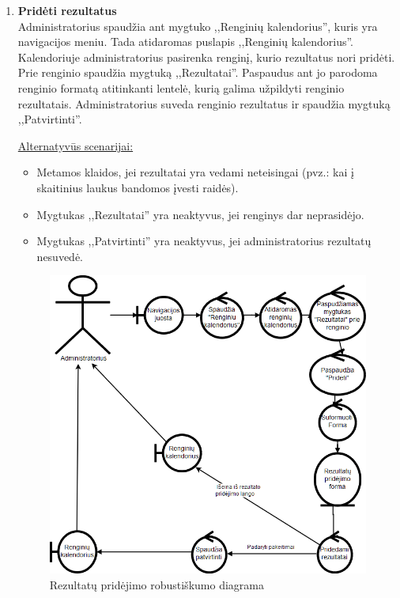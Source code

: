 \documentclass{VUMIFPSkursinis}
\begin{document}
\begin{enumerate} [label = \textbf{U\arabic*.}]
			\item \textbf{Pridėti rezultatus}   \\
					Administratorius spaudžia ant mygtuko ,,Renginių kalendorius'', kuris yra navigacijos meniu. Tada atidaromas puslapis ,,Renginių kalendorius''. Kalendoriuje administratorius pasirenka renginį, kurio rezultatus nori pridėti. Prie renginio spaudžia mygtuką ,,Rezultatai''. Paspaudus ant jo parodoma renginio formatą atitinkanti lentelė, kurią galima užpildyti renginio rezultatais. Administratorius suveda renginio rezultatus ir spaudžia mygtuką ,,Patvirtinti''.
					
					\underline{Alternatyvūs scenarijai:}
					\begin{itemize}
						\item Metamos klaidos, jei rezultatai yra vedami neteisingai (pvz.: kai į skaitinius laukus bandomos įvesti raidės).
						\item Mygtukas ,,Rezultatai'' yra neaktyvus, jei renginys dar neprasidėjo.
						\item Mygtukas ,,Patvirtinti'' yra neaktyvus, jei administratorius rezultatų nesuvedė.
					\end{itemize}
					
					\begin{figure}[H]
						\centering
						\includegraphics[width=\textwidth]{img/PSI5/u25.png}
						\caption{Rezultatų pridėjimo robustiškumo diagrama}
						\label{draw:u25}
					\end{figure}
					

\end{enumerate}
\end{document}
